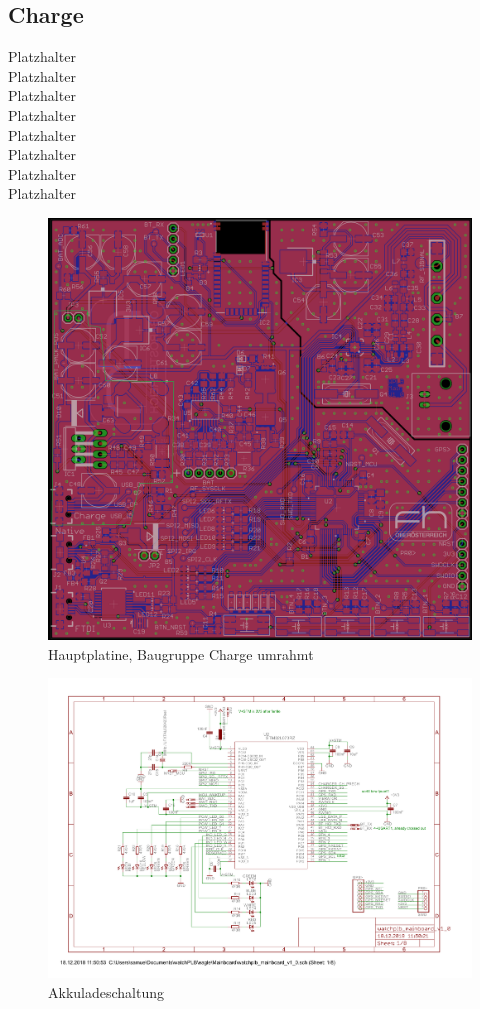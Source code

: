 \documentclass[a4paper]{scrartcl}
\begin{document}
\subsection{Charge}

Platzhalter\\Platzhalter\\Platzhalter\\Platzhalter\\Platzhalter\\Platzhalter\\
Platzhalter\\Platzhalter

\begin{figure}[H]\centering
\includegraphics[page=1, angle=0, width=\linewidth]{../Documentation/pics/mainboard_charge.png}
\caption{Hauptplatine, Baugruppe Charge umrahmt}
\end{figure}

\begin{figure}[H]\centering
\includegraphics[page=5, angle=90, width=\linewidth]{../eagle/Mainboard/watchplb_mainboard_v1_0.pdf}
\caption{Akkuladeschaltung}
\end{figure}
\end{document}
